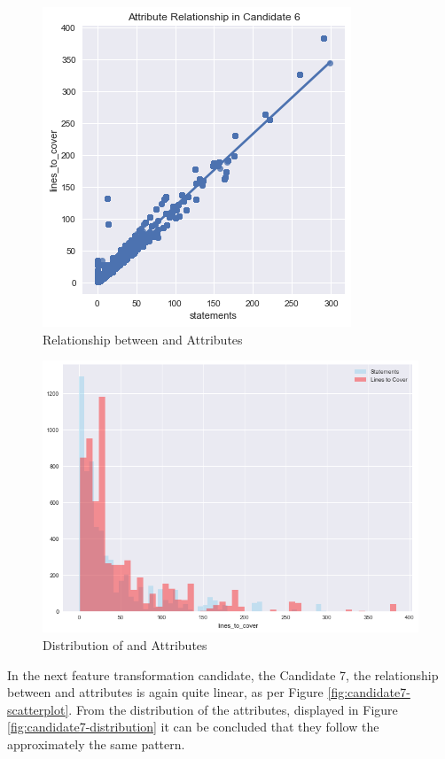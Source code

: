 \begin{enumerate}
\begin{figure}[!h]
    \centering
    \includegraphics[scale=0.7]{Figures/correlation/Attribute_Relationship_in_Candidate_6.png}
    \caption{Relationship between \statements{} and \linesToCover{} Attributes}
    \label{fig:candidate6-scatterplot}
\end{figure}

\begin{figure}
    \centering
    \includegraphics[scale=0.6]{Figures/correlation/Attribute_Distribution_in_Candidate_6.png}
    \caption{Distribution of \statements{} and \linesToCover{} Attributes}
    \label{fig:candidate6-distribution}
\end{figure}

In the next feature transformation candidate, the Candidate 7, the relationship between \ncloc{} and \lines{} attributes is again quite linear, as per Figure \ref{fig:candidate7-scatterplot}. From the distribution of the attributes, displayed in Figure \ref{fig:candidate7-distribution} it can be concluded that they follow the approximately the same pattern.


\end{enumerate}
